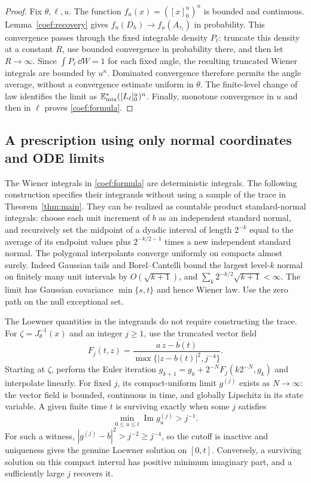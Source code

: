 \begin{proof}
Fix $\theta,\ell,u$. The function $f_u(x)=([x]_0^u)^n$ is bounded
and continuous. Lemma~\ref{coef:recovery} gives
$f_u(D_h)\to f_u(A_{\tau_\ell})$ in probability. This convergence
passes through the fixed integrable density $P_\ell$: truncate this density at a constant $R$,
use bounded convergence in probability there, and then let $R\to\infty$.
Since $\int P_\ell\,\dd W=1$ for each fixed angle, the resulting
truncated Wiener integrals are bounded by $u^n$.  Dominated convergence
therefore permits the angle average, without a convergence estimate
uniform in $\theta$.  The finite-level change of law identifies the
limit as $\mathbb E_{\mathrm{mix}}^*([L_\ell]_0^u)^n$.
Finally, monotone convergence in $u$ and then in $\ell$ proves
\eqref{coef:formula}.
\end{proof}

\subsection{A prescription using only normal coordinates and ODE limits}

The Wiener integrals in \eqref{coef:formula} are deterministic
integrals. The following construction specifies their integrands without
using a sample of the trace in Theorem~\ref{thm:main}.  They can be realized
as countable product standard-normal integrals: choose each unit
increment of $b$ as an independent standard normal, and recursively set
the midpoint of a dyadic interval of length $2^{-k}$ equal to the average
of its endpoint values plus $2^{-k/2-1}$ times a new independent standard
normal.  The polygonal interpolants converge uniformly on compacts almost
surely.  Indeed Gaussian tails and Borel--Cantelli bound the largest
level-$k$ normal on finitely many unit intervals by $O(\sqrt{k+1})$,
and $\sum_k2^{-k/2}\sqrt{k+1}<\infty$.  The limit has Gaussian covariance
$\min\{s,t\}$ and hence Wiener law.  Use the zero path on the null
exceptional set.

The Loewner quantities in the integrands do not require constructing the
trace.  For $\zeta=J_\theta^{-1}(x)$ and an integer $j\ge1$, use the
truncated vector field
\[
 F_j(t,z)=\frac{a\,\overline{z-b(t)}}
                    {\max\{|z-b(t)|^2,j^{-4}\}}.
\]
Starting at $\zeta$, perform the Euler iteration
$g_{k+1}=g_k+2^{-N}F_j(k2^{-N},g_k)$ and interpolate linearly.
For fixed $j$, its compact-uniform limit $g^{(j)}$ exists as $N\to\infty$:
the vector field is bounded, continuous in time, and globally Lipschitz
in its state variable.  A given finite time $t$ is surviving exactly when
some $j$ satisfies
\[
 \min_{0\le u\le t}\operatorname{Im}g_u^{(j)}>j^{-1}.
\]
For such a witness, $|g^{(j)}-b|^2>j^{-2}\ge j^{-4}$, so the cutoff is
inactive and uniqueness gives the genuine Loewner solution on $[0,t]$.
Conversely, a surviving solution on this compact interval has positive
minimum imaginary part, and a sufficiently large $j$ recovers it.


